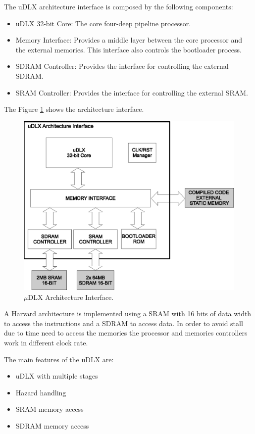 \documentclass{article}
\begin{document}
The uDLX architecture interface is composed by the following components:

	\begin{itemize}
	  \item uDLX 32-bit Core: The core four-deep pipeline processor.
	  \item Memory Interface: Provides a middle layer between the core processor and the external memories. This interface also controls the bootloader process. 
    \item SDRAM Controller: Provides the interface for controlling the external SDRAM.
	\item SRAM Controller: Provides the interface for controlling the external SRAM.
	\end{itemize}

	The Figure \ref{fig:architecture_if} shows the architecture interface.

  \begin{figure}[H]
    \centering
    \includegraphics[width=.8\linewidth]{../architecture/pictures/architecture_interface.eps}
    \caption{$\mu$DLX Architecture Interface.}
    \label{fig:architecture_if}    
  \end{figure}	

	A Harvard architecture is implemented using a SRAM with 16 bits of data width to access the instructions and a SDRAM to access data. In order to avoid stall due to time need to access the memories the processor and memories controllers work in different clock rate.

	The main features of the uDLX are:
	\begin{itemize}
		\item uDLX with multiple stages
		\item Hazard handling
		\item SRAM memory access
		\item SDRAM memory access
	\end{itemize}
\end{document}
